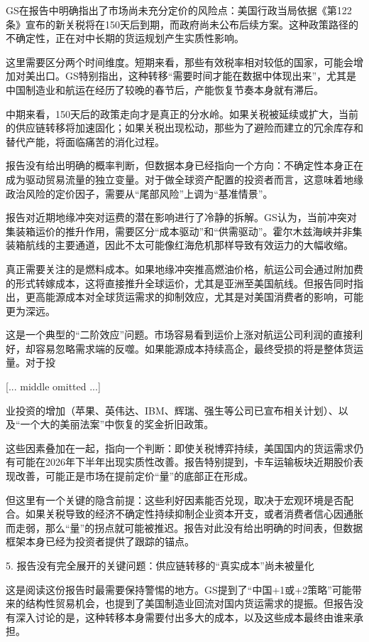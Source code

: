 \documentclass[11pt]{ctexart}
\begin{document}
GS在报告中明确指出了市场尚未充分定价的风险点：美国行政当局依据《第122条》宣布的新关税将在150天后到期，而政府尚未公布后续方案。这种政策路径的不确定性，正在对中长期的货运规划产生实质性影响。

这里需要区分两个时间维度。短期来看，那些有效税率相对较低的国家，可能会增加对美出口。GS特别指出，这种转移“需要时间才能在数据中体现出来”，尤其是中国制造业和航运在经历了较晚的春节后，产能恢复节奏本身就有滞后。

中期来看，150天后的政策走向才是真正的分水岭。如果关税被延续或扩大，当前的供应链转移将加速固化；如果关税出现松动，那些为了避险而建立的冗余库存和替代产能，将面临痛苦的消化过程。

报告没有给出明确的概率判断，但数据本身已经指向一个方向：不确定性本身正在成为驱动贸易流量的独立变量。对于做全球资产配置的投资者而言，这意味着地缘政治风险的定价因子，需要从“尾部风险”上调为“基准情景”。

报告对近期地缘冲突对运费的潜在影响进行了冷静的拆解。GS认为，当前冲突对集装箱运价的推升作用，需要区分“成本驱动”和“供需驱动”。霍尔木兹海峡并非集装箱航线的主要通道，因此不太可能像红海危机那样导致有效运力的大幅收缩。

真正需要关注的是燃料成本。如果地缘冲突推高燃油价格，航运公司会通过附加费的形式转嫁成本，这将直接推升全球运价，尤其是亚洲至美国航线。但报告同时指出，更高能源成本对全球货运需求的抑制效应，尤其是对美国消费者的影响，可能更为深远。

这是一个典型的“二阶效应”问题。市场容易看到运价上涨对航运公司利润的直接利好，却容易忽略需求端的反噬。如果能源成本持续高企，最终受损的将是整体货运量。对于投

[... middle omitted ...]

业投资的增加（苹果、英伟达、IBM、辉瑞、强生等公司已宣布相关计划）、以及“一个大的美丽法案”中恢复的奖金折旧政策。

这些因素叠加在一起，指向一个判断：即使关税博弈持续，美国国内的货运需求仍有可能在2026年下半年出现实质性改善。报告特别提到，卡车运输板块近期股价表现改善，可能正是市场在提前定价“量”的底部正在形成。

但这里有一个关键的隐含前提：这些利好因素能否兑现，取决于宏观环境是否配合。如果关税导致的经济不确定性持续抑制企业资本开支，或者消费者信心因通胀而走弱，那么“量”的拐点就可能被推迟。报告对此没有给出明确的时间表，但数据框架本身已经为投资者提供了跟踪的锚点。

5. 报告没有完全展开的关键问题：供应链转移的“真实成本”尚未被量化

这是阅读这份报告时最需要保持警惕的地方。GS提到了“中国+1或+2策略”可能带来的结构性贸易机会，也提到了美国制造业回流对国内货运需求的提振。但报告没有深入讨论的是，这种转移本身需要付出多大的成本，以及这些成本最终由谁来承担。
\end{document}
